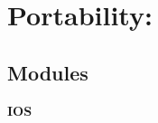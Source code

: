 \section{\-Portability\-:}
\label{group__port}
\subsection*{\-Modules}
\begin{DoxyCompactItemize}
\item 
{\bf \-I\-O\-S}
\end{DoxyCompactItemize}
